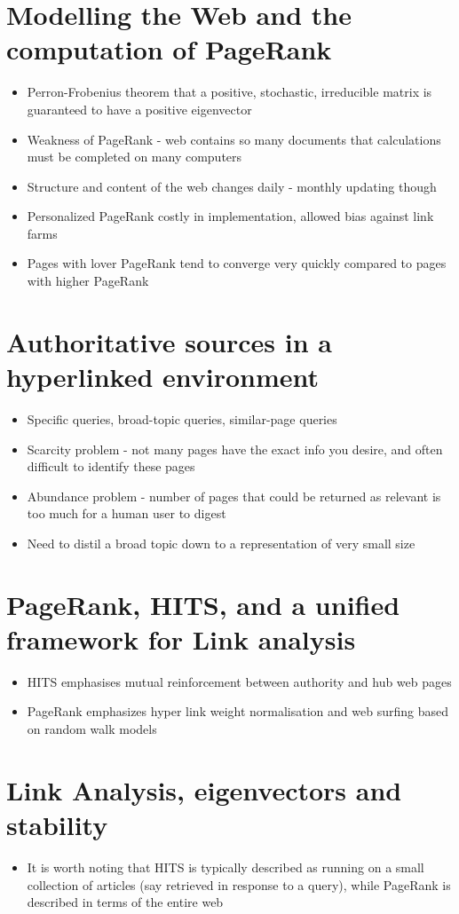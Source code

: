 \documentclass[11pt]{report}
\begin{document}
\section{Modelling the Web and the computation of PageRank}
\begin{itemize}
\item Perron-Frobenius theorem that a positive, stochastic, irreducible matrix is guaranteed to have a positive eigenvector
\item Weakness of PageRank - web contains so many documents that calculations must be completed on many computers
\item Structure and content of the web changes daily - monthly updating though
\item Personalized PageRank costly in implementation, allowed bias against link farms
\item Pages with lover PageRank tend to converge very quickly compared to pages with higher PageRank
\end{itemize}
\section{Authoritative sources in a hyperlinked environment}
\begin{itemize}
\item Specific queries, broad-topic queries, similar-page queries
\item Scarcity problem - not many pages have the exact info you desire, and often difficult to identify these pages
\item Abundance problem - number of pages that could be returned as relevant is too much for a human user to digest
\item Need to distil a broad topic down to a representation of very small size
\end{itemize}
\section{PageRank, HITS, and a unified framework for Link analysis}
\begin{itemize}
\item HITS emphasises mutual reinforcement between authority and hub web pages
\item PageRank emphasizes hyper link weight normalisation and web surfing based on random walk models 
\end{itemize}
\section{Link Analysis, eigenvectors and stability}
\begin{itemize}
\item It is worth noting that HITS is typically described as running on a small collection of articles (say retrieved in response to a query), while PageRank is described in terms of the entire web
\end{itemize}
\end{document}
